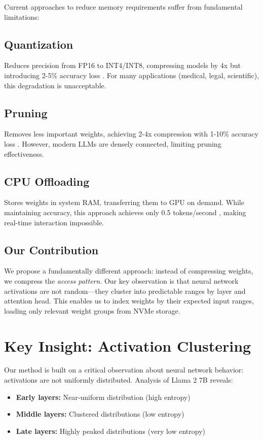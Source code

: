 \documentclass[twocolumn,10pt]{article}
\begin{document}
Current approaches to reduce memory requirements suffer from fundamental limitations:

\subsection{Quantization}
Reduces precision from FP16 to INT4/INT8, compressing models by 4x but introducing 2-5\% accuracy loss \cite{frantar2022gptq}. For many applications (medical, legal, scientific), this degradation is unacceptable.

\subsection{Pruning}
Removes less important weights, achieving 2-4x compression with 1-10\% accuracy loss \cite{han2015deep}. However, modern LLMs are densely connected, limiting pruning effectiveness.

\subsection{CPU Offloading}
Stores weights in system RAM, transferring them to GPU on demand. While maintaining accuracy, this approach achieves only 0.5 tokens/second \cite{llamacpp}, making real-time interaction impossible.

\subsection{Our Contribution}
We propose a fundamentally different approach: instead of compressing weights, we compress the \textit{access pattern}. Our key observation is that neural network activations are not random—they cluster into predictable ranges by layer and attention head. This enables us to index weights by their expected input ranges, loading only relevant weight groups from NVMe storage.

\section{Key Insight: Activation Clustering}

Our method is built on a critical observation about neural network behavior: activations are not uniformly distributed. Analysis of Llama 2 7B reveals:

\begin{itemize}
    \item \textbf{Early layers:} Near-uniform distribution (high entropy)
    \item \textbf{Middle layers:} Clustered distributions (low entropy)
    \item \textbf{Late layers:} Highly peaked distributions (very low entropy)
\end{itemize}
\end{document}
